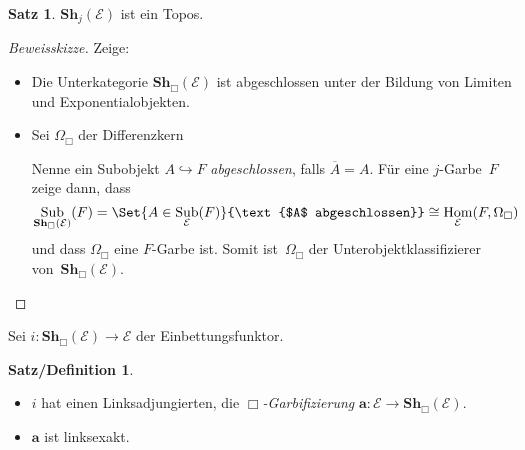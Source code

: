 \documentclass{article}
\theoremstyle{definition}
\newtheorem*{satz}{Satz}
\newtheorem*{satzdefn}{Satz/Definition}
\theoremstyle{remark}
\newcommand{\?}{\,{:}\,}
\renewcommand{\_}{\mathpunct{.}\,}
\DeclareMathOperator{\Hom}{Hom} %
\DeclareMathOperator{\id}{id} %
\DeclareMathOperator{\Sub}{Sub} %
\newcommand{\clos}[1]{\overline{{#1}}} %
\newcommand{\sheafification}{\mathbf{a}} %
\newcommand{\Sh}{\mathbf{Sh}} %
\newcommand{\Eat}{\mathcal{E}} %
\begin{document}
\begin{satz}
  $\Sh_j(\Eat)$ ist ein Topos.
\end{satz}

\begin{proof}[Beweisskizze]
  Zeige:
  \begin{itemize}
    \item Die Unterkategorie $\Sh_\Box(\Eat)$ ist abgeschlossen unter der Bildung von Limiten und Exponentialobjekten.
    \item
      Sei $\Omega_\Box$ der Differenzkern


      Nenne ein Subobjekt $A \hookrightarrow F$ \emph{abgeschlossen}, falls $\clos{A} = A$.
      Für eine $j$-Garbe~$F$ zeige dann, dass
      \[
        \Sub_{\Sh_\Box(\Eat)}(F) =
        \Set{A \in \Sub_\Eat(F)}{\text{$A$ abgeschlossen}} \cong
        \Hom_\Eat(F, \Omega_\Box)
      \]
      und dass $\Omega_\Box$ eine $F$-Garbe ist.
      Somit ist~$\Omega_\Box$ der Unterobjektklassifizierer von~$\Sh_\Box(\Eat)$. \qedhere
  \end{itemize}
\end{proof}

Sei $i : \Sh_\Box(\Eat) \to \Eat$ der Einbettungsfunktor.

\begin{satzdefn}
  \begin{minipage}[t]{0.99 \linewidth}
    \begin{itemize}
      \item $i$ hat einen Linksadjungierten, die \emph{$\Box$-Garbifizierung} $\sheafification : \Eat \to \Sh_\Box(\Eat)$.
      \item $\sheafification$ ist linksexakt.
    \end{itemize}
  \end{minipage}
\end{satzdefn}
\end{document}
